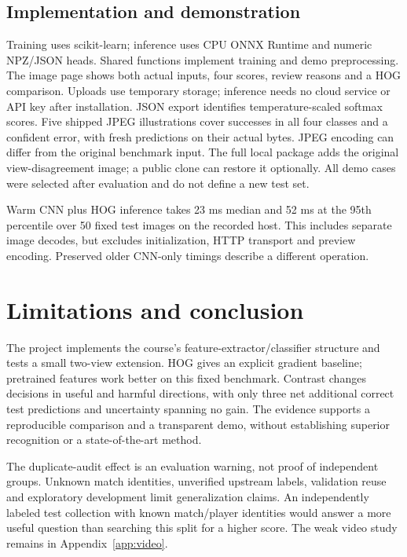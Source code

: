\subsection{Implementation and demonstration}
Training uses scikit-learn; inference uses CPU ONNX Runtime and numeric NPZ/JSON heads. Shared functions implement training and demo preprocessing. The image page shows both actual inputs, four scores, review reasons and a HOG comparison. Uploads use temporary storage; inference needs no cloud service or API key after installation. JSON export identifies temperature-scaled softmax scores. Five shipped JPEG illustrations cover successes in all four classes and a confident error, with fresh predictions on their actual bytes. JPEG encoding can differ from the original benchmark input. The full local package adds the original view-disagreement image; a public clone can restore it optionally. All demo cases were selected after evaluation and do not define a new test set.

Warm CNN plus HOG inference takes 23 ms median and 52 ms at the 95th percentile over 50 fixed test images on the recorded host. This includes separate image decodes, but excludes initialization, HTTP transport and preview encoding. Preserved older CNN-only timings describe a different operation.

\section{Limitations and conclusion}
The project implements the course's feature-extractor/classifier structure and tests a small two-view extension. HOG gives an explicit gradient baseline; pretrained features work better on this fixed benchmark. Contrast changes decisions in useful and harmful directions, with only three net additional correct test predictions and uncertainty spanning no gain. The evidence supports a reproducible comparison and a transparent demo, without establishing superior recognition or a state-of-the-art method.

The duplicate-audit effect is an evaluation warning, not proof of independent groups. Unknown match identities, unverified upstream labels, validation reuse and exploratory development limit generalization claims. An independently labeled test collection with known match/player identities would answer a more useful question than searching this split for a higher score. The weak video study remains in Appendix~\ref{app:video}.
